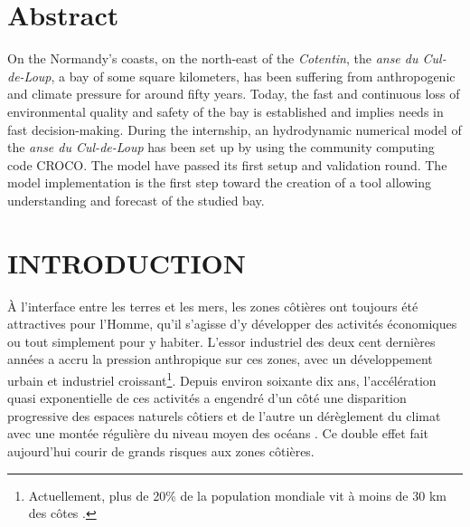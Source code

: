 \documentclass[10pt,a4paper,titlepage]{article}
\begin{document}
\section*{Abstract}
On the Normandy's coasts, on the north-east of the \textit{Cotentin}, the \textit{anse du Cul-de-Loup}, a bay of some square kilometers, has been suffering from anthropogenic and climate pressure for around fifty years.
Today, the fast and continuous loss of environmental quality and safety of the bay is established and implies needs in fast decision-making.
During the internship, an hydrodynamic numerical model of the \textit{anse du Cul-de-Loup} has been set up by using the community computing code CROCO.
The model have passed its first setup and validation round.
The model implementation is the first step toward the creation of a tool allowing understanding and forecast of the studied bay.


\newpage

    \tableofcontents
    \newpage

    \section{INTRODUCTION}
    \label{sec:introduction}



    À l'interface entre les terres et les mers, les zones côtières ont toujours été attractives pour l'Homme, qu'il s'agisse d'y développer des activités économiques ou tout simplement pour y habiter.
    L’essor industriel des deux cent dernières années a accru la pression anthropique sur ces zones, avec un développement urbain et industriel croissant\footnote{Actuellement, plus de 20\% de la population mondiale vit à moins de 30 km des côtes \parencite{senat2015}.}.
    Depuis environ soixante dix ans, l'accélération quasi exponentielle de ces activités a engendré d'un côté une disparition progressive des espaces naturels côtiers et de l'autre un dérèglement du climat avec une montée régulière du niveau moyen des océans \parencite{ipcc2021}. Ce double effet fait aujourd'hui courir de grands risques aux zones côtières.
\end{document}
